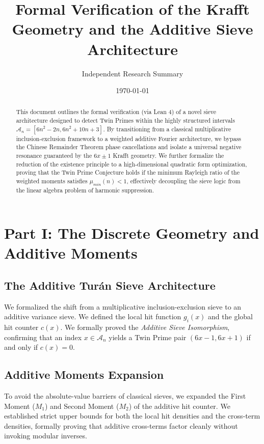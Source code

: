 \documentclass[12pt]{article}
\title{Formal Verification of the Krafft Geometry and the Additive Sieve Architecture}
\author{Independent Research Summary}
\date{\today}
\begin{document}
\maketitle

\begin{abstract}
This document outlines the formal verification (via Lean 4) of a novel sieve architecture
designed to detect Twin Primes within the highly structured intervals
$\mathcal{A}_n = [6n^2 - 2n, 6n^2 + 10n + 3]$. By transitioning from a classical multiplicative
inclusion-exclusion framework to a weighted additive Fourier architecture, we bypass
the Chinese Remainder Theorem phase cancellations and isolate a universal negative resonance
guaranteed by the $6x \pm 1$ Krafft geometry. We further formalize the reduction of the
existence principle to a high-dimensional quadratic form optimization, proving that the
Twin Prime Conjecture holds if the minimum Rayleigh ratio of the weighted moments
satisfies $\mu_{min}(n) < 1$, effectively decoupling the sieve logic from the
linear algebra problem of harmonic suppression.
\end{abstract}

\section{Part I: The Discrete Geometry and Additive Moments}

\subsection{The Additive Turán Sieve Architecture}

We formalized the shift from a multiplicative inclusion-exclusion sieve to an additive variance
sieve. We defined the local hit function $g_i(x)$ and the global hit counter $c(x)$. We formally
proved the \textit{Additive Sieve Isomorphism}, confirming that an index $x \in \mathcal{A}_n$ yields a
Twin Prime pair $(6x-1, 6x+1)$ if and only if $c(x) = 0$.

\subsection{Additive Moments Expansion}

To avoid the absolute-value barriers of classical sieves, we expanded the First Moment ($M_1$) and
Second Moment ($M_2$) of the additive hit counter. We established strict upper bounds for both the
local hit densities and the cross-term densities, formally proving that additive cross-terms factor
cleanly without invoking modular inverses. 
\end{document}
